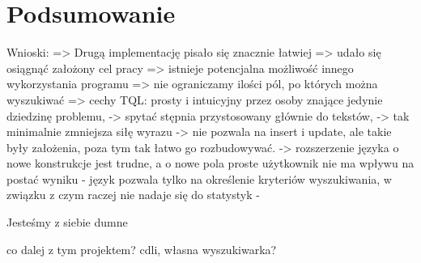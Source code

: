 \chapter*{Podsumowanie}
% 

Wnioski:
=> Drugą implementację pisało się znacznie łatwiej
=> udało się osiągnąć założony cel pracy
=> istnieje potencjalna możliwość innego wykorzystania programu
=> nie ograniczamy ilości pól, po których można wyszukiwać
=> cechy TQL:
      prosty i intuicyjny przez osoby znające jedynie dziedzinę problemu, -> spytać stępnia 
      przystosowany głównie do tekstów, -> tak
      minimalnie zmniejsza siłę wyrazu -> nie pozwala na insert i update, ale takie były założenia, poza tym tak
      łatwo go rozbudowywać. -> rozszerzenie języka o nowe konstrukcje jest trudne, a o nowe pola proste
      użytkownik nie ma wpływu na postać wyniku - język pozwala tylko na określenie kryteriów wyszukiwania,
 w związku z czym raczej nie nadaje się do statystyk -


Jesteśmy z siebie dumne

co dalej z tym projektem? cdli, własna wyszukiwarka?